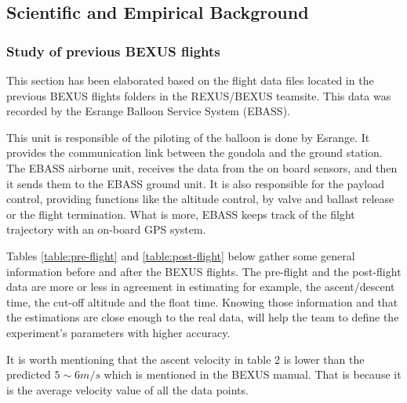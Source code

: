 \subsection{Scientific and Empirical Background}

\subsubsection{Study of previous BEXUS flights}
This section has been elaborated based on the flight data files located in the previous BEXUS flights folders in the REXUS/BEXUS teamsite. This data was recorded by the Esrange Balloon Service System (EBASS).

\smallskip
This unit is responsible of the piloting of the balloon is done by Esrange. It provides the communication link between the gondola and the ground station. The EBASS airborne unit, receives the data from the on board sensors, and then it sends them to the EBASS ground unit. It is also responsible for the payload control, providing functions like the altitude control, by valve and ballast release or the flight termination. What is more, EBASS keeps track of the filght trajectory with an on-board GPS system.

\smallskip
Tables \ref{table:pre-flight} and \ref{table:post-flight} below gather some general information before and after the BEXUS flights. The pre-flight and the post-flight data are more or less in agreement in estimating for example, the ascent/descent time, the cut-off altitude and the float time. Knowing those information and that the estimations are close enough to the real data, will help the team to define the experiment's parameters with higher accuracy. 

\smallskip
It is worth mentioning that the ascent velocity in table 2 is lower than the predicted $5\sim 6m/s$ which is mentioned in the BEXUS manual. That is because it is the average velocity value of all the data points.  

